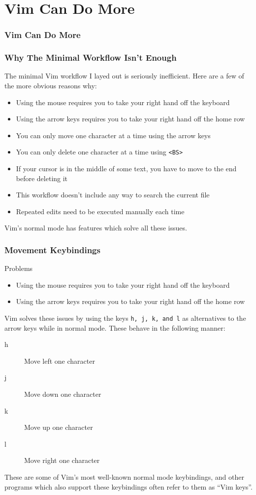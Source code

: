 \documentclass{beamer}
\begin{document}
\section{Vim Can Do More}

\begin{frame}
    \frametitle{Vim Can Do More}
    \tableofcontents[currentsection]
\end{frame}

\begin{frame}[fragile]
    \frametitle{Why The Minimal Workflow Isn't Enough}
    \small
    The minimal Vim workflow I layed out is seriously inefficient. Here are a few of the more obvious reasons why:
    \begin{itemize}
	\item Using the mouse requires you to take your right hand off the keyboard
	\item Using the arrow keys requires you to take your right hand off the home row
	\item You can only move one character at a time using the arrow keys
	\item You can only delete one character at a time using \verb+<BS>+
	\item If your cursor is in the middle of some text, you have to move to the end before deleting it
	\item This workflow doesn't include any way to search the current file
	\item Repeated edits need to be executed manually each time
    \end{itemize}
    Vim's normal mode has features which solve all these issues.
\end{frame}

\begin{frame}[fragile]
    \frametitle{Movement Keybindings}
    \small
    \begin{block}{Problems}
	\begin{itemize}
	    \item Using the mouse requires you to take your right hand off the keyboard
	    \item Using the arrow keys requires you to take your right hand off the home row
	\end{itemize}
    \end{block}
    Vim solves these issues by using the keys \verb+h, j, k, and l+ as alternatives to the arrow keys while in normal mode. These behave in the following manner:
    \begin{description}
	\item[h] Move left one character
	\item[j] Move down one character
	\item[k] Move up one character
	\item[l] Move right one character
    \end{description}
    These are some of Vim's most well-known normal mode keybindings, and other programs which also support these keybindings often refer to them as \enquote{Vim keys}.
\end{frame}
\end{document}
